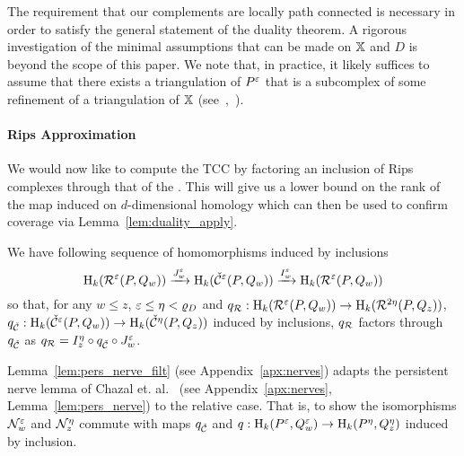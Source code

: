 The requirement that our complements are locally path connected is necessary in order to satisfy the general statement of the duality theorem.
A rigorous investigation of the minimal assumptions that can be made on $\mathbb{X}$ and $D$ is beyond the scope of this paper.
We note that, in practice, it likely suffices to assume that there exists a triangulation of $P^\varepsilon$ that is a subcomplex of some refinement of a triangulation of $\mathbb{X}$ (see~\cite{cavanna2017when},~\cite{julian83alexander}).

\paragraph{Rips Approximation}

We would now like to compute the TCC by factoring an inclusion of Rips complexes through that of the \Cech.
This will give us a lower bound on the rank of the map induced on $d$-dimensional homology which can then be used to confirm coverage via Lemma~\ref{lem:duality_apply}.

We have following sequence of homomorphisms induced by inclusions
\[ \mathrm{H}_k(\mathcal{R}^\varepsilon(P, Q_w))\xrightarrow{J_w^\varepsilon}\mathrm{H}_k(\check{\mathcal{C}}^\varepsilon(P, Q_w))\xrightarrow{I_w^\varepsilon}\mathrm{H}_k(\mathcal{R}^\varepsilon(P, Q_w))\]
so that, for any $w\leq z$, $\varepsilon\leq\eta < \varrho_D$ and $q_{\mathcal{R}} : \mathrm{H}_k(\mathcal{R}^\varepsilon(P, Q_w))\to \mathrm{H}_k(\mathcal{R}^{2\eta}(P, Q_z))$, $q_{\check{\mathcal{C}}} : \mathrm{H}_k(\check{\mathcal{C}}^\varepsilon(P, Q_w))\to \mathrm{H}_k(\check{\mathcal{C}}^{\eta}(P, Q_z))$ induced by inclusions, $q_{\mathcal{R}}$ factors through $q_{\check{\mathcal{C}}}$ as $q_{\mathcal{R}} = I_z^\eta\circ q_{\check{\mathcal{C}}}\circ J_w^\varepsilon$.

Lemma~\ref{lem:pers_nerve_filt} (see Appendix~\ref{apx:nerves}) adapts the persistent nerve lemma of Chazal et. al.~\cite{chazal08towards} (see Appendix~\ref{apx:nerves}, Lemma~\ref{lem:pers_nerve}) to the relative case.
That is, to show the isomorphisms $\mathcal{N}_w^\varepsilon$ and $\mathcal{N}_z^\eta$ commute with maps $q_{\check{\mathcal{C}}}$ and $q : \mathrm{H}_k(P^\varepsilon, Q_w^\varepsilon)\to\mathrm{H}_k(P^\eta, Q_z^\eta)$  induced by inclusion.%

